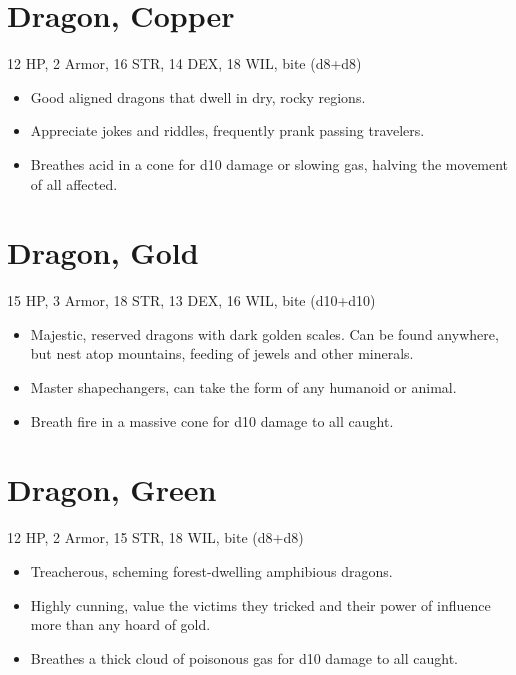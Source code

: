\documentclass[
  10pt,
  american,
]{article}
\begin{document}
\hypertarget{dragon-copper}{%
\section{Dragon, Copper}\label{dragon-copper}}

12 HP, 2 Armor, 16 STR, 14 DEX, 18 WIL, bite (d8+d8)

\begin{samepage}
\begin{itemize}
\setlength\itemsep{-.5em}
\item Good aligned dragons that dwell in dry, rocky regions.
\item Appreciate jokes and riddles, frequently prank passing travelers.
\item Breathes acid in a cone for d10 damage or slowing gas, halving the movement of all affected.
\end{itemize}
\end{samepage}

\hypertarget{dragon-gold}{%
\section{Dragon, Gold}\label{dragon-gold}}

15 HP, 3 Armor, 18 STR, 13 DEX, 16 WIL, bite (d10+d10)

\begin{samepage}
\begin{itemize}
\setlength\itemsep{-.5em}
\item Majestic, reserved dragons with dark golden scales. Can be found anywhere, but nest atop mountains, feeding of jewels and other minerals.
\item Master shapechangers, can take the form of any humanoid or animal.
\item Breath fire in a massive cone for d10 damage to all caught.
\end{itemize}
\end{samepage}

\hypertarget{dragon-green}{%
\section{Dragon, Green}\label{dragon-green}}

12 HP, 2 Armor, 15 STR, 18 WIL, bite (d8+d8)

\begin{samepage}
\begin{itemize}
\setlength\itemsep{-.5em}
\item Treacherous, scheming forest-dwelling amphibious dragons.
\item Highly cunning, value the victims they tricked and their power of influence more than any hoard of gold.
\item Breathes a thick cloud of poisonous gas for d10 damage to all caught.
\end{itemize}
\end{samepage}
\end{document}
